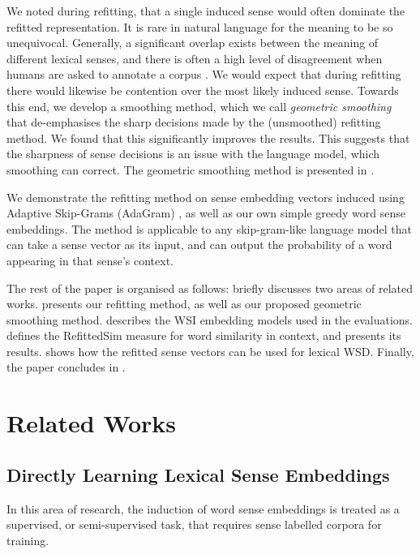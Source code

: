 {We noted during refitting, that a single induced sense would often dominate the refitted representation.
It is rare in natural language for the meaning to be so unequivocal.
Generally, a significant overlap exists between the meaning of different lexical senses, and there is often a high level of disagreement when humans are asked to annotate a corpus \parencite{veronis1998study}.
We would expect that during refitting there would likewise be contention over the most likely induced sense.
Towards this end, we develop a smoothing method, which we call \emph{geometric smoothing} that de-emphasises the sharp decisions made by the (unsmoothed) refitting method.
We found that this significantly improves the results.
This suggests that the sharpness of sense decisions is an issue with the language model, which smoothing can correct.
The geometric smoothing method is presented in .


We demonstrate the refitting method on sense embedding vectors induced using Adaptive Skip-Grams (AdaGram) \parencite{AdaGrams}, as well as our own simple greedy word sense embeddings.
The method is applicable to any skip-gram-like language model that can take a sense vector as its input, and can output the probability of a word appearing in that sense's context.


The rest of the paper is organised as follows:  briefly discusses two areas of related works.
 presents our refitting method, as well as our proposed geometric smoothing method.
 describes the WSI embedding models used in the evaluations.
 defines the RefittedSim measure for word similarity in context, and presents its results.
 shows how the refitted sense vectors can be used for lexical WSD.
Finally, the paper concludes in .

\section{Related Works} \label{relatedwords}

\subsection{Directly Learning Lexical Sense Embeddings}
In this area of research, the induction of word sense embeddings is treated as a supervised, or semi-supervised task, that requires sense labelled corpora for training.

}
